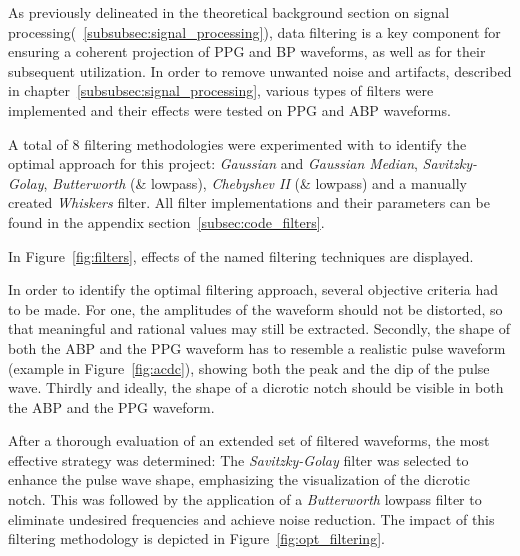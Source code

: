 As previously delineated in the theoretical background section on signal processing(~\ref{subsubsec:signal_processing}),
data filtering is a key component for ensuring a coherent projection of PPG and BP waveforms, as well as for their subsequent utilization.
In order to remove unwanted noise and artifacts, described in chapter~\ref{subsubsec:signal_processing}, various types of filters were implemented and their effects were tested on PPG and ABP waveforms.

A total of 8 filtering methodologies were experimented with to identify the optimal approach for this project:
\textit{Gaussian} and \textit{Gaussian Median}, \textit{Savitzky-Golay}, \textit{Butterworth} (\& lowpass),
\textit{Chebyshev II} (\& lowpass) and a manually created \textit{Whiskers} filter.
All filter implementations and their parameters can be found in the appendix section~\ref{subsec:code_filters}.

In Figure~\ref{fig:filters}, effects of the named filtering techniques are displayed.

In order to identify the optimal filtering approach, several objective criteria had to be made.
For one, the amplitudes of the waveform should not be distorted, so that meaningful and rational values may still be extracted.
Secondly, the shape of both the ABP and the PPG waveform has to resemble a realistic pulse waveform (example in Figure~\ref{fig:acdc}), showing both the peak and the dip of the pulse wave.
Thirdly and ideally, the shape of a dicrotic notch should be visible in both the ABP and the PPG waveform.

After a thorough evaluation of an extended set of filtered waveforms, the most effective strategy was determined:
The \textit{Savitzky-Golay} filter was selected to enhance the pulse wave shape, emphasizing the visualization of the dicrotic notch.
This was followed by the application of a \textit{Butterworth} lowpass filter to eliminate undesired frequencies and achieve noise reduction.
The impact of this filtering methodology is depicted in Figure~\ref{fig:opt_filtering}.

